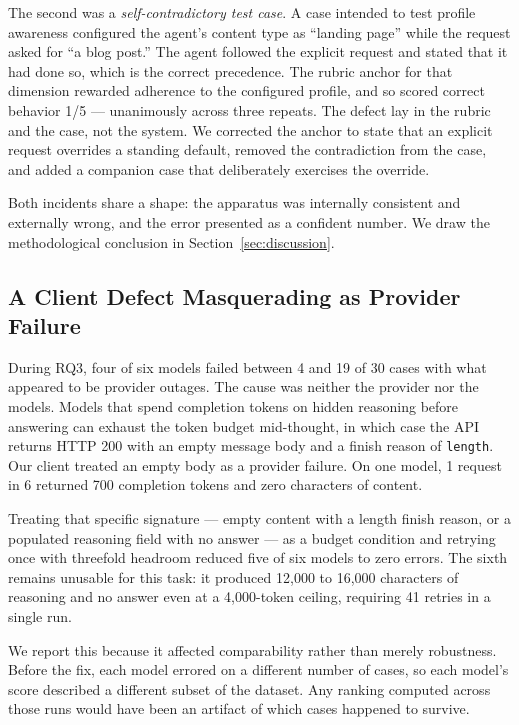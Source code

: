 \documentclass[journal]{IEEEtran}
\begin{document}
The second was a \emph{self-contradictory test case}. A case intended to test
profile awareness configured the agent's content type as ``landing page'' while
the request asked for ``a blog post.'' The agent followed the explicit request
and stated that it had done so, which is the correct precedence. The rubric
anchor for that dimension rewarded adherence to the configured profile, and so
scored correct behavior 1/5 --- unanimously across three repeats. The defect
lay in the rubric and the case, not the system. We corrected the anchor to state
that an explicit request overrides a standing default, removed the
contradiction from the case, and added a companion case that deliberately
exercises the override.

Both incidents share a shape: the apparatus was internally consistent and
externally wrong, and the error presented as a confident number. We draw the
methodological conclusion in Section~\ref{sec:discussion}.

\subsection{A Client Defect Masquerading as Provider Failure}
\label{sec:reasoning}

During RQ3, four of six models failed between 4 and 19 of 30 cases with what
appeared to be provider outages. The cause was neither the provider nor the
models. Models that spend completion tokens on hidden reasoning before
answering can exhaust the token budget mid-thought, in which case the API
returns HTTP 200 with an empty message body and a finish reason of
\texttt{length}. Our client treated an empty body as a provider failure. On one
model, 1 request in 6 returned 700 completion tokens and zero characters of
content.

Treating that specific signature --- empty content with a length finish reason,
or a populated reasoning field with no answer --- as a budget condition and
retrying once with threefold headroom reduced five of six models to zero
errors. The sixth remains unusable for this task: it produced 12{,}000 to
16{,}000 characters of reasoning and no answer even at a 4{,}000-token ceiling,
requiring 41 retries in a single run.

We report this because it affected comparability rather than merely robustness.
Before the fix, each model errored on a different number of cases, so each
model's score described a different subset of the dataset. Any ranking computed
across those runs would have been an artifact of which cases happened to
survive.
\end{document}
